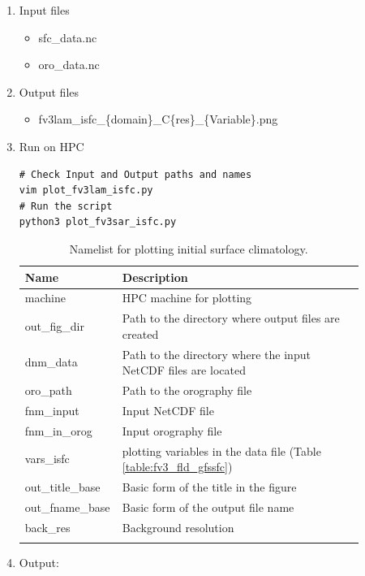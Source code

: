 \documentclass[11pt,fleqn]{report}              %
\begin{document}
\begin{enumerate}
\item Input files
\begin{itemize}
\item sfc\_data.nc
\item oro\_data.nc 
\end{itemize}
\item Output files
\begin{itemize}
\item fv3lam\_isfc\_\{domain\}\_C\{res\}\_\{Variable\}.png
\end{itemize}
\item Run on HPC

\lstset{language=bash}   
\begin{lstlisting}[frame=trBL]
# Check Input and Output paths and names
vim plot_fv3lam_isfc.py
# Run the script
python3 plot_fv3sar_isfc.py
\end{lstlisting}

{
\fontsize{10}{12}\selectfont
\begin{longtable}{p{0.17\linewidth} | p{0.7\linewidth} }
\hline
\hline
Name & Description \\
\hline
 machine & HPC machine for plotting \\
 out\_fig\_dir & Path to the directory where output files are created \\ 
 dnm\_data & Path to the directory where the input NetCDF files are located   \\
 oro\_path & Path to the orography file \\
 fnm\_input & Input NetCDF file \\
 fnm\_in\_orog & Input orography file \\
 vars\_isfc & plotting variables in the data file (Table \ref{table:fv3_fld_gfssfc}) \\
 out\_title\_base & Basic form of the title in the figure \\
 out\_fname\_base & Basic form of the output file name \\
 back\_res & Background resolution \\
\hline
\caption{Namelist for plotting initial surface climatology.}
\label{table:fv3_var_isfc}
\end{longtable}
}


\item Output:


\end{enumerate}
\end{document}
